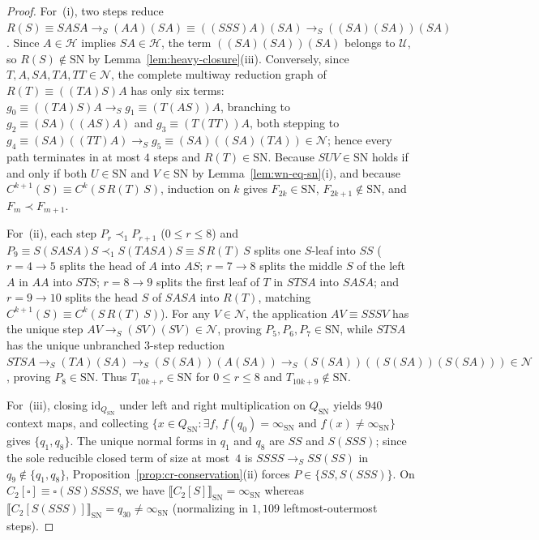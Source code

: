 \documentclass[11pt,reqno]{amsart}
\numberwithin{equation}{section}
\theoremstyle{plain}
\theoremstyle{definition}
\theoremstyle{remark}
\newcommand{\SN}{\mathrm{SN}}
\newcommand{\sem}[1]{\llbracket #1 \rrbracket}
\newcommand{\redS}{\to_S}
\begin{document}
\begin{proof}
For~(i), two steps reduce $R(S) \equiv S A S A \redS (A A)(S A) \equiv ((S S S) A)(S A) \redS ((S A)(S A))(S A)$. Since $A \in \mathcal{H}$ implies $S A \in \mathcal{H}$, the term $((S A)(S A))(S A)$ belongs to $\mathcal{U}$, so $R(S) \notin \SN$ by Lemma~\ref{lem:heavy-closure}(iii). Conversely, since $T, A, S A, T A, T T \in \mathcal{N}$, the complete multiway reduction graph of $R(T) \equiv ((T A) S) A$ has only six terms: $g_0 \equiv ((T A) S) A \redS g_1 \equiv (T(A S))A$, branching to $g_2 \equiv (S A)((A S) A)$ and $g_3 \equiv (T(T T)) A$, both stepping to $g_4 \equiv (S A)((T T) A) \redS g_5 \equiv (S A)((S A)(T A)) \in \mathcal{N}$; hence every path terminates in at most $4$ steps and $R(T) \in \SN$. Because $S U V \in \SN$ holds if and only if both $U \in \SN$ and $V \in \SN$ by Lemma~\ref{lem:wn-eq-sn}(i), and because $C^{k+1}(S) \equiv C^k(S\,R(T)\,S)$, induction on $k$ gives $F_{2k} \in \SN$, $F_{2k+1} \notin \SN$, and $F_m \prec F_{m+1}$.

For~(ii), each step $P_r \prec_1 P_{r+1}$ ($0 \le r \le 8$) and $P_9 \equiv S(S A S A)S \prec_1 S(T A S A)S \equiv S\,R(T)\,S$ splits one $S$-leaf into $S S$ ($r = 4 \to 5$ splits the head of $A$ into $A S$; $r = 7 \to 8$ splits the middle $S$ of the left $A$ in $A A$ into $S T S$; $r = 8 \to 9$ splits the first leaf of $T$ in $S T S A$ into $S A S A$; and $r = 9 \to 10$ splits the head $S$ of $S A S A$ into $R(T)$, matching $C^{k+1}(S) \equiv C^k(S\,R(T)\,S)$). For any $V \in \mathcal{N}$, the application $A V \equiv S S S V$ has the unique step $A V \redS (S V)(S V) \in \mathcal{N}$, proving $P_5, P_6, P_7 \in \SN$, while $S T S A$ has the unique unbranched $3$-step reduction $S T S A \redS (T A)(S A) \redS (S(S A))(A(S A)) \redS (S(S A))((S(S A))(S(S A))) \in \mathcal{N}$, proving $P_8 \in \SN$. Thus $T_{10k + r} \in \SN$ for $0 \le r \le 8$ and $T_{10k + 9} \notin \SN$.

For~(iii), closing $\mathrm{id}_{Q_{\SN}}$ under left and right multiplication on $Q_{\SN}$ yields $940$ context maps, and collecting $\{ x \in Q_{\SN} : \exists f,\, f(q_0) = \infty_{\SN} \textrm{ and } f(x) \neq \infty_{\SN} \}$ gives $\{q_1, q_8\}$. The unique normal forms in $q_1$ and $q_8$ are $S S$ and $S(S S S)$; since the sole reducible closed term of size at most~$4$ is $S S S S \redS S S (S S)$ in $q_9 \notin \{q_1, q_8\}$, Proposition~\ref{prop:cr-conservation}(ii) forces $P \in \{S S, S(S S S)\}$. On $C_2[\square] \equiv \square(S S)S S S S$, we have $\sem{C_2[S]}_{\SN} = \infty_{\SN}$ whereas $\sem{C_2[S(S S S)]}_{\SN} = q_{30} \neq \infty_{\SN}$ (normalizing in $1{,}109$ leftmost-outermost steps).
\end{proof}
\end{document}
